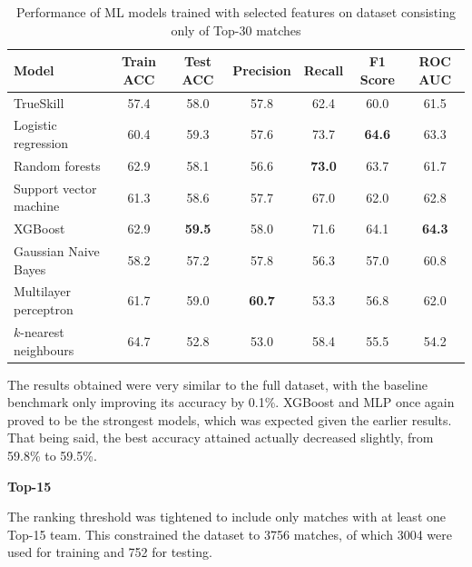 \begin{table}[h!]
	\centering
	\small
	\begin{adjustbox}{center} %
		\begin{tabular}{ |l|c|c|c|c|c|c| }
			\hline
			\rule{0pt}{2.6ex} \textbf{Model} & \textbf{Train ACC} & \textbf{Test ACC} & \textbf{Precision} & \textbf{Recall} & \textbf{F1 Score} & \textbf{ROC AUC} \\
			\hline
			\rule{0pt}{2.6ex} TrueSkill 				& 57.4 & 58.0 & 57.8 & 62.4 & 60.0 & 61.5 \\ \hline
			\rule{0pt}{2.6ex} Logistic regression 		& 60.4 & 59.3 & 57.6 & 73.7 & \textbf{64.6} & 63.3 \\
			\rule{0pt}{2.6ex} Random forests 			& 62.9 & 58.1 & 56.6 & \textbf{73.0} & 63.7 & 61.7 \\
			\rule{0pt}{2.6ex} Support vector machine 	& 61.3 & 58.6 & 57.7 & 67.0 & 62.0 & 62.8 \\
			\rule{0pt}{2.6ex} XGBoost 					& 62.9 & \textbf{59.5} & 58.0 & 71.6 & 64.1 & \textbf{64.3} \\
			\rule{0pt}{2.6ex} Gaussian Naive Bayes 		& 58.2 & 57.2 & 57.8 & 56.3 & 57.0 & 60.8 \\
			\rule{0pt}{2.6ex} Multilayer perceptron		& 61.7 & 59.0 & \textbf{60.7} & 53.3 & 56.8 & 62.0 \\
			\rule{0pt}{2.6ex} $k$-nearest neighbours 	& 64.7 & 52.8 & 53.0 & 58.4 & 55.5 & 54.2 \\
			\hline
		\end{tabular}
	\end{adjustbox}
	\caption{Performance of ML models trained with selected features on dataset consisting only of Top-30 matches}
	\label{table:4}
\end{table}

The results obtained were very similar to the full dataset, with the baseline benchmark only improving its accuracy by 0.1\%. XGBoost and MLP once again proved to be the strongest models, which was expected given the earlier results. That being said, the best accuracy attained actually decreased slightly, from 59.8\% to 59.5\%.

\textbf{Top-15}

The ranking threshold was tightened to include only matches with at least one Top-15 team. This constrained the dataset to 3756 matches, of which 3004 were used for training and 752 for testing.

